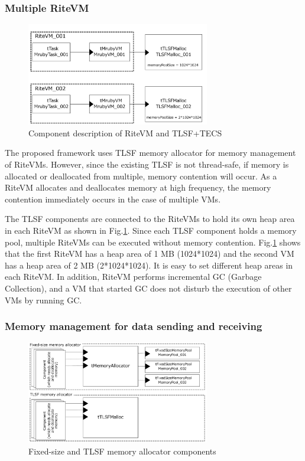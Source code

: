 \documentclass[JIP]{ipsj_v2/UTF8/ipsj}
\begin{document}
\subsubsection{Multiple RiteVM}

\begin{figure}[t]
    \centering
    \includegraphics[width=8cm,clip]{figure/UseCase_mruby.pdf}
    \caption{Component description of RiteVM and TLSF+TECS}
    \label{fig:UseCase_mruby}
\end{figure}

The proposed framework uses TLSF memory allocator for memory management of RiteVMs.
However, since the existing TLSF is not thread-safe, if memory is allocated or deallocated from multiple, memory contention will occur.
As a RiteVM allocates and deallocates memory at high frequency, the memory contention immediately occurs in the case of multiple VMs.

The TLSF components are connected to the RiteVMs to hold its own heap area in each RiteVM as shown in Fig.\ref{fig:UseCase_mruby}.
Since each TLSF component holds a memory pool, multiple RiteVMs can be executed without memory contention.
Fig.\ref{fig:UseCase_mruby} shows that the first RiteVM has a heap area of 1 MB (1024*1024) and the second VM has a heap area of 2 MB (2*1024*1024).
It is easy to set different heap areas in each RiteVM.
In addition, RiteVM performs incremental GC (Garbage Collection), and a VM that started GC does not disturb the execution of other VMs by running GC.
    
\subsubsection{Memory management for data sending and receiving}

\begin{figure}[t]
    \centering
    \includegraphics[width=8cm,clip]{figure/UseCase_TINET.pdf}
    \caption{Fixed-size and TLSF memory allocator components}
    \label{fig:UseCase_TINET}
\end{figure}
\end{document}
